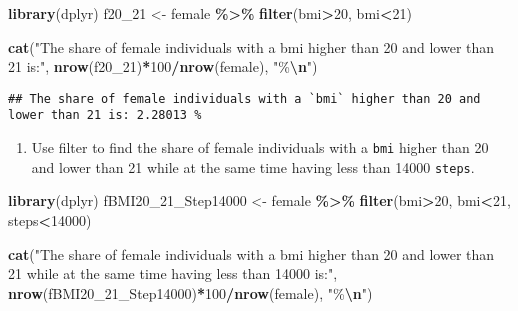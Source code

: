 \documentclass[
]{book}
\newenvironment{Shaded}{\begin{snugshade}}{\end{snugshade}}
\newcommand{\DecValTok}[1]{\textcolor[rgb]{0.00,0.00,0.81}{#1}}
\newcommand{\FunctionTok}[1]{\textcolor[rgb]{0.13,0.29,0.53}{\textbf{#1}}}
\newcommand{\NormalTok}[1]{#1}
\newcommand{\OtherTok}[1]{\textcolor[rgb]{0.56,0.35,0.01}{#1}}
\newcommand{\SpecialCharTok}[1]{\textcolor[rgb]{0.81,0.36,0.00}{\textbf{#1}}}
\newcommand{\StringTok}[1]{\textcolor[rgb]{0.31,0.60,0.02}{#1}}
\providecommand{\tightlist}{%
  \setlength{\itemsep}{0pt}\setlength{\parskip}{0pt}}
\begin{document}
\begin{Shaded}
\begin{Highlighting}[]
\FunctionTok{library}\NormalTok{(dplyr)}
\NormalTok{f20\_21 }\OtherTok{\textless{}{-}}\NormalTok{ female }\SpecialCharTok{\%\textgreater{}\%}
  \FunctionTok{filter}\NormalTok{(bmi}\SpecialCharTok{\textgreater{}}\DecValTok{20}\NormalTok{, bmi}\SpecialCharTok{\textless{}}\DecValTok{21}\NormalTok{)}

\FunctionTok{cat}\NormalTok{(}\StringTok{"The share of female individuals with a \textasciigrave{}bmi\textasciigrave{} higher than 20 and lower than 21 is:"}\NormalTok{, }\FunctionTok{nrow}\NormalTok{(f20\_21)}\SpecialCharTok{*}\DecValTok{100}\SpecialCharTok{/}\FunctionTok{nrow}\NormalTok{(female), }\StringTok{"\%}\SpecialCharTok{\textbackslash{}n}\StringTok{"}\NormalTok{)}
\end{Highlighting}
\end{Shaded}

\begin{verbatim}
## The share of female individuals with a `bmi` higher than 20 and lower than 21 is: 2.28013 %
\end{verbatim}

\begin{enumerate}
\def\labelenumi{\arabic{enumi}.}
\setcounter{enumi}{6}
\tightlist
\item
  Use filter to find the share of female individuals with a \texttt{bmi} higher than 20 and lower than 21 while at the same time having less than 14000 \texttt{steps}.
\end{enumerate}

\begin{Shaded}
\begin{Highlighting}[]
\FunctionTok{library}\NormalTok{(dplyr)}
\NormalTok{fBMI20\_21\_Step14000 }\OtherTok{\textless{}{-}}\NormalTok{ female }\SpecialCharTok{\%\textgreater{}\%}
  \FunctionTok{filter}\NormalTok{(bmi}\SpecialCharTok{\textgreater{}}\DecValTok{20}\NormalTok{, bmi}\SpecialCharTok{\textless{}}\DecValTok{21}\NormalTok{, steps}\SpecialCharTok{\textless{}}\DecValTok{14000}\NormalTok{)}

\FunctionTok{cat}\NormalTok{(}\StringTok{"The share of female individuals with a \textasciigrave{}bmi\textasciigrave{} higher than 20 and lower than 21 while at the same time having less than 14000 is:"}\NormalTok{, }\FunctionTok{nrow}\NormalTok{(fBMI20\_21\_Step14000)}\SpecialCharTok{*}\DecValTok{100}\SpecialCharTok{/}\FunctionTok{nrow}\NormalTok{(female), }\StringTok{"\%}\SpecialCharTok{\textbackslash{}n}\StringTok{"}\NormalTok{)}
\end{Highlighting}
\end{Shaded}
\end{document}

